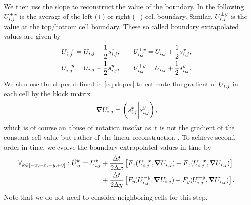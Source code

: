We then use the slope to reconstruct the value of the boundary.
In the following $U_{i,j}^{\pm x}$ is the average of the left ($+$) or right ($-$) cell boundary.
Similar, $U_{i,j}^{\pm y}$ is the value at the top/bottom cell boundary.
These so called boundary extrapolated values are given by
\newcommand{\extrapolatedCellAvg}[3][i,j]{\cellAvg[#1]^{#3 #2} = \cellAvg #3 \frac{1}{2} \slope{#2}}
\begin{equation}
\begin{alignedat}{2}
& \extrapolatedCellAvg{x}{-} , \qquad && \extrapolatedCellAvg{x}{+}, \\
& \extrapolatedCellAvg{y}{-} , \qquad && \extrapolatedCellAvg{y}{+}.
\end{alignedat}
\end{equation}
We also use the slopes defined in \cref{eq:slopes} to estimate the gradient of $U_{i,j}$ in each cell by the block matrix
\begin{equation}
  \label{eq:muscl-gradient}
  \gradCellAvg = \left( \slope{x} \bigg\rvert \slope{y} \right),
\end{equation}
which is of course an abuse of notation insofar as it is not the gradient of the constant cell value but rather of the linear reconstruction .
To achieve second order in time, we evolve the boundary extrapolated values in time by
\newcommand{\evolvedCellAvg}[2][i,j]{\hat{U}_{#1}^{#2}}
\begin{equation}\label{eq:muscl-time-evolution}
  \begin{split}
  \forall_{k \in [-x, +x, -y, +y]}:  \hat{U}_{ij}^k = \cellAvg^k &+
  \frac{\Delta t}{2 \Delta x} \left[ \fluxX(\cellAvg^{-x}, \gradCellAvg) - \fluxX(\cellAvg^{+x}, \gradCellAvg) \right] \\&+
  \frac{\Delta t}{2 \Delta y} \left[ \fluxY(\cellAvg^{-y}, \gradCellAvg) - \fluxY(\cellAvg^{+y}, \gradCellAvg) \right].
  \end{split}
\end{equation}
Note that we do not need to consider neighboring cells for this step.

